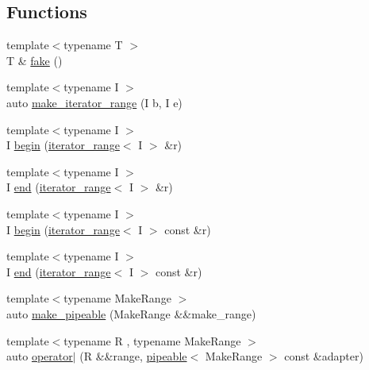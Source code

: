 \subsection*{Functions}
\begin{DoxyCompactItemize}
\item 
{\footnotesize template$<$typename T $>$ }\\T \& \mbox{\hyperlink{namespace_r_a_h___n_a_m_e_s_p_a_c_e_a23011f56a88d50b186adcd2ba96daecd}{fake}} ()
\item 
{\footnotesize template$<$typename I $>$ }\\auto \mbox{\hyperlink{namespace_r_a_h___n_a_m_e_s_p_a_c_e_a9663e7b91642eed0f6bbcacace9118fe}{make\+\_\+iterator\+\_\+range}} (I b, I e)
\item 
{\footnotesize template$<$typename I $>$ }\\I \mbox{\hyperlink{namespace_r_a_h___n_a_m_e_s_p_a_c_e_a40db588db40ca52dae948613525ac1b4}{begin}} (\mbox{\hyperlink{struct_r_a_h___n_a_m_e_s_p_a_c_e_1_1iterator__range}{iterator\+\_\+range}}$<$ I $>$ \&r)
\item 
{\footnotesize template$<$typename I $>$ }\\I \mbox{\hyperlink{namespace_r_a_h___n_a_m_e_s_p_a_c_e_ad5f90a809a5221569377c400175a20bf}{end}} (\mbox{\hyperlink{struct_r_a_h___n_a_m_e_s_p_a_c_e_1_1iterator__range}{iterator\+\_\+range}}$<$ I $>$ \&r)
\item 
{\footnotesize template$<$typename I $>$ }\\I \mbox{\hyperlink{namespace_r_a_h___n_a_m_e_s_p_a_c_e_a226e473d9053e6dbcdc5fa4d135b7abe}{begin}} (\mbox{\hyperlink{struct_r_a_h___n_a_m_e_s_p_a_c_e_1_1iterator__range}{iterator\+\_\+range}}$<$ I $>$ const \&r)
\item 
{\footnotesize template$<$typename I $>$ }\\I \mbox{\hyperlink{namespace_r_a_h___n_a_m_e_s_p_a_c_e_ac27794282c76c7027fac8b956ffd0a2a}{end}} (\mbox{\hyperlink{struct_r_a_h___n_a_m_e_s_p_a_c_e_1_1iterator__range}{iterator\+\_\+range}}$<$ I $>$ const \&r)
\item 
{\footnotesize template$<$typename Make\+Range $>$ }\\auto \mbox{\hyperlink{namespace_r_a_h___n_a_m_e_s_p_a_c_e_a4f8277a9bf35f4c28d8be20d1cd4bc1b}{make\+\_\+pipeable}} (Make\+Range \&\&make\+\_\+range)
\item 
{\footnotesize template$<$typename R , typename Make\+Range $>$ }\\auto \mbox{\hyperlink{namespace_r_a_h___n_a_m_e_s_p_a_c_e_ac70ad03bbe29c97324a4ffe14f7990fc}{operator$\vert$}} (R \&\&range, \mbox{\hyperlink{struct_r_a_h___n_a_m_e_s_p_a_c_e_1_1pipeable}{pipeable}}$<$ Make\+Range $>$ const \&adapter)

\end{DoxyCompactItemize}
